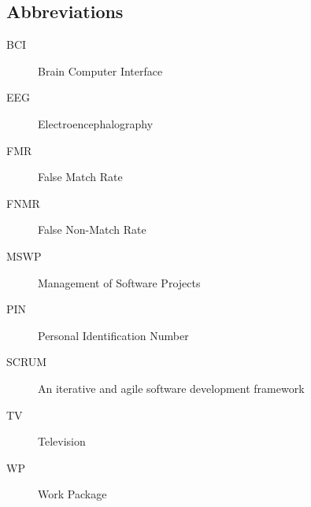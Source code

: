 \documentclass[a4paper,11pt]{article}
\begin{document}
\begin{appendix}

\pagebreak

{}




\pagebreak

\section*{Abbreviations}
 
 \begin{description}
  \item[BCI] Brain Computer Interface  
  \item[EEG] Electroencephalography
  \item[FMR] False Match Rate
  \item[FNMR] False Non-Match Rate 
  \item[MSWP] Management of Software Projects
  \item[PIN] Personal Identification Number
  \item[SCRUM] An iterative and agile software development framework
  \item[TV] Television
  \item[WP] Work Package
  
 \end{description}

\end{appendix}
\end{document}
